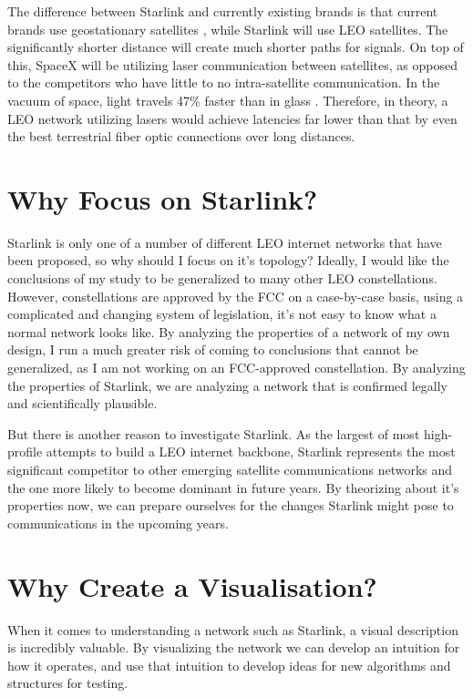 \documentclass[12pt]{report}
\begin{document}
The difference between Starlink and currently existing brands is that current brands use geostationary satellites \cite{HughesPressRelease}, while Starlink will use LEO satellites. The significantly shorter distance will create much shorter paths for signals. On top of this, SpaceX will be utilizing laser communication between satellites, as opposed to the competitors who have little to no intra-satellite communication. In the vacuum of space, light travels 47\% faster than in glass \cite{PropertiesOfGlass}. Therefore, in theory, a LEO network utilizing lasers would achieve latencies far lower than that by even the best terrestrial fiber optic connections over long distances.

\section{Why Focus on Starlink?}

Starlink is only one of a number of different LEO internet networks that have been proposed, so why should I focus on it's topology? Ideally, I would like the conclusions of my study to be generalized to many other LEO constellations. However, constellations are approved by the FCC on a case-by-case basis, using a complicated and changing system of legislation, it's not easy to know what a normal network looks like. By analyzing the properties of a network of my own design, I run a much greater risk of coming to conclusions that cannot be generalized, as I am not working on an FCC-approved constellation. By analyzing the properties of Starlink, we are analyzing a network that is confirmed legally and scientifically plausible.

But there is another reason to investigate Starlink. As the largest of most high-profile attempts to build a LEO internet backbone, Starlink represents the most significant competitor to other emerging satellite communications networks and the one more likely to become dominant in future years. By theorizing about it's properties now, we can prepare ourselves for the changes Starlink might pose to communications in the upcoming years.

\section{Why Create a Visualisation?}
When it comes to understanding a network such as Starlink, a visual description is incredibly valuable. By visualizing the network we can develop an intuition for how it operates, and use that intuition to develop ideas for new algorithms and structures for testing.
\end{document}

